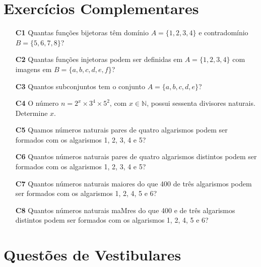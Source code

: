 \documentclass[a4paper,12pt]{article}
\begin{document}
\section{Exercícios Complementares}

\begin{enumerate}

\item[\textbf{C1}] Quantas funções bijetoras têm domínio $A = \{1, 2, 3, 4 \}$ e contradomínio $B = \{5, 6, 7, 8 \}$? 

\item[\textbf{C2}] Quantas funções injetoras podem ser definidas em $A = \{1, 2, 3, 4\}$ com imagens em $B = \{a, b, c, d, e, f\}$? 

\item[\textbf{C3}] Quantos subconjuntos tem o conjunto $A = \{a, b, c, d, e\}$? 

\item[\textbf{C4}] O número $n = 2^x \times 3^4 \times 5^2 \textrm{, com } x \in \mathbb{N}$, possui sessenta divisores naturais. Determine $x$. 

\item[\textbf{C5}] Quamos números naturais pares de quatro algarismos podem ser formados com os algarismos 1, 2, 3, 4 e 5? 

\item[\textbf{C6}] Quantos números naturais pares de quatro algarismos distintos podem ser formados com os algarismos 1, 2, 3, 4 e 5?

\item[\textbf{C7}] Quantos números naturais maiores do que 400 de três algarismos podem ser formados com os algarismos 1, 2, 4, 5 e 6?

\item[\textbf{C8}] Quantos números naturais maMres do que 400 e de três algarismos distintos podem ser formados com os algarismos 1, 2, 4, 5 e 6? 

\end{enumerate}

\section{Questões de Vestibulares}
\end{document}
